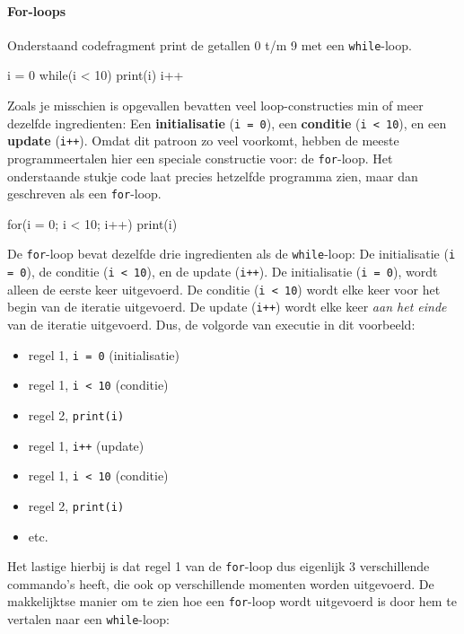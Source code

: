 \paragraph{For-loops}
Onderstaand codefragment print de getallen 0 t/m 9 met een \texttt{while}-loop.

\begin{nnflisting}
i = 0
while(i < 10)
    print(i)
    i++
\end{nnflisting}

Zoals je misschien is opgevallen bevatten veel loop-constructies min of meer dezelfde ingredienten: Een \textbf{initialisatie} (\texttt{i = 0}), een \textbf{conditie} (\texttt{i < 10}), en een \textbf{update} (\texttt{i++}). Omdat dit patroon zo veel voorkomt, hebben de meeste programmeertalen hier een speciale constructie voor: de \texttt{for}-loop. Het onderstaande stukje code laat precies hetzelfde programma zien, maar dan geschreven als een \texttt{for}-loop.

\begin{nnflisting}
for(i = 0; i < 10; i++)
    print(i)
\end{nnflisting}

De \texttt{for}-loop bevat dezelfde drie ingredienten als de \texttt{while}-loop: De initialisatie (\texttt{i = 0}), de conditie (\texttt{i < 10}), en de update (\texttt{i++}). De initialisatie (\texttt{i = 0}), wordt alleen de eerste keer uitgevoerd. De conditie (\texttt{i < 10}) wordt elke keer voor het begin van de iteratie uitgevoerd. De update (\texttt{i++}) wordt elke keer \emph{aan het einde} van de iteratie uitgevoerd. Dus, de volgorde van executie in dit voorbeeld:

\begin{itemize}
\item regel 1, \texttt{i = 0} (initialisatie)
\item regel 1, \texttt{i < 10} (conditie)
\item regel 2, \texttt{print(i)}
\item regel 1, \texttt{i++} (update)
\item regel 1, \texttt{i < 10} (conditie)
\item regel 2, \texttt{print(i)}
\item etc.
\end{itemize}

Het lastige hierbij is dat regel 1 van de \texttt{for}-loop dus eigenlijk 3 verschillende commando's heeft, die ook op verschillende momenten worden uitgevoerd. De makkelijktse manier om te zien hoe een \texttt{for}-loop wordt uitgevoerd is door hem te vertalen naar een \texttt{while}-loop:

